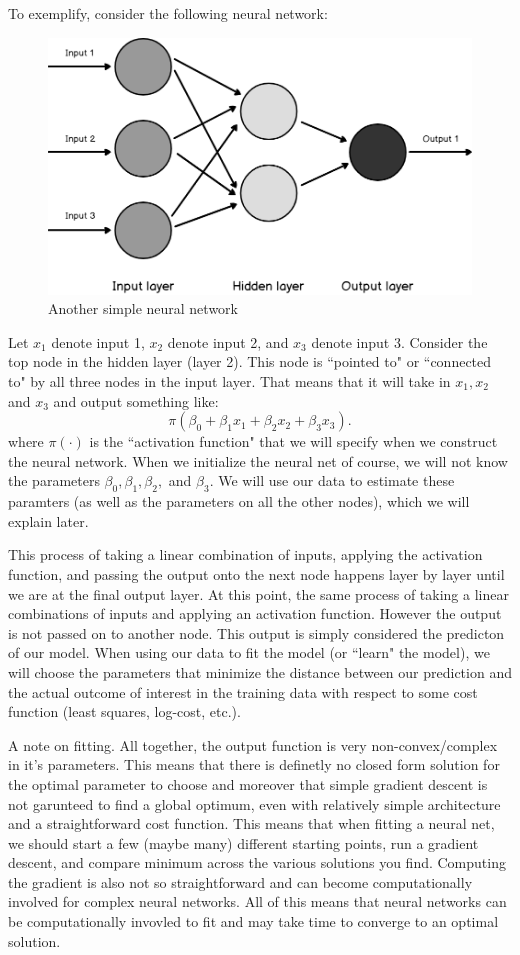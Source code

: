 \documentclass[10pt]{article}
\begin{document}
To exemplify, consider the following neural network:

\begin{figure}[htb!]
	\centering
	\includegraphics[width=0.7\linewidth]{neural-three.png}
	\caption{Another simple neural network}%
	\label{fig:neural-three}
\end{figure}

Let \(x_1\) denote input 1,  \(x_2\) denote input 2,  and \(x_3\) denote input 3. Consider the top node in the hidden layer (layer 2). This node is ``pointed to" or ``connected to" by all three nodes in the input layer. That means that it will take in \(x_1, x_2\) and  \(x_3\) and output something like:
 \[
	 \pi\left(\beta_0 + \beta_1x_1 + \beta_2x_2 + \beta_3x_3\right)
.\] 
where \(\pi\left(\cdot\right)\) is the ``activation function" that we will specify when we construct the neural network. When we initialize the neural net of course, we will not know the parameters \(\beta_0, \beta_1, \beta_2,\) and  \(\beta_3\). We will use our data to estimate these paramters (as well as the parameters on all the other nodes), which we will explain later.

This process of taking a linear combination of inputs, applying the activation function, and passing the output onto the next node happens layer by layer until we are at the final output layer. At this point, the same process of taking a linear combinations of inputs and applying an activation function. However the output is not passed on to another node. This output is simply considered the predicton of our model. When using our data to fit the model (or ``learn" the model), we will choose the parameters that minimize the distance between our prediction and the actual outcome of interest in the training data with respect to some cost function (least squares, log-cost, etc.).

A note on fitting. All together, the output function is very non-convex/complex in it's parameters. This means that there is definetly no closed form solution for the optimal parameter to choose and moreover that simple gradient descent is not garunteed to find a global optimum, even with relatively simple architecture and a straightforward cost function. This means that when fitting a neural net, we should start a few (maybe many) different starting points, run a gradient descent, and compare minimum across the various solutions you find. Computing the gradient is also not so straightforward and can become computationally involved for complex neural networks. All of this means that neural networks can be computationally invovled to fit and may take time to converge to an optimal solution.
\end{document}
